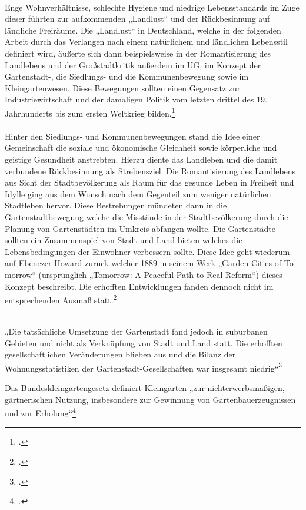 \documentclass{scrartcl}
\begin{document}
\\
Enge Wohnverhältnisse, schlechte Hygiene und niedrige Lebensstandards im Zuge dieser führten zur aufkommenden „Landlust“ und der Rückbesinnung auf ländliche Freiräume. Die „Landlust“ in Deutschland, welche in der folgenden Arbeit durch das Verlangen nach einem natürlichem und ländlichen Lebensstil definiert wird, äußerte sich dann beispielsweise in der Romantisierung des Landlebens und der Großstadtkritik außerdem im UG, im Konzept der Gartenstadt-, die Siedlungs- und die Kommunenbewegung sowie im Kleingartenwesen. Diese Bewegungen sollten einen Gegensatz zur Industriewirtschaft und der damaligen Politik vom letzten drittel des 19. Jahrhunderts bis zum ersten Weltkrieg bilden.\footcite[Vgl.][S. 35]{Egnolff2015DieIdeal}\\
\\
Hinter den Siedlungs- und Kommunenbewegungen stand die Idee einer Gemeinschaft die soziale und ökonomische Gleichheit sowie körperliche und geistige Gesundheit anstrebten. Hierzu diente das Landleben und die damit verbundene Rückbesinnung als Strebensziel. Die Romantisierung des Landlebens aus Sicht der Stadtbevölkerung als Raum für das gesunde Leben in Freiheit und Idylle ging aus dem Wunsch nach dem Gegenteil zum weniger natürlichen Stadtleben hervor. Diese Bestrebungen mündeten dann in die Gartenstadtbewegung welche die Misstände in der Stadtbevölkerung durch die Planung von Gartenstädten im Umkreis abfangen wollte. Die Gartenstädte sollten ein Zusammenspiel von Stadt und Land bieten welches die Lebensbedingungen der Einwohner verbessern sollte. Diese Idee geht wiederum auf Ebenezer Howard zurück welcher 1889 in seinem Werk „Garden Cities of To-morrow“ (ursprünglich „Tomorrow: A Peaceful Path to Real Reform“) dieses Konzept beschreibt. Die erhofften Entwicklungen fanden dennoch nicht im entsprechenden Ausmaß statt.\footcite[Vgl.][S. 36]{Egnolff2015DieIdeal}\\
\\
\begin{displayquote}
„Die tatsächliche Umsetzung der Gartenstadt fand jedoch in suburbanen Gebieten und nicht als Verknüpfung von Stadt und Land statt. Die erhofften gesellschaftlichen Veränderungen blieben aus und die Bilanz der Wohnungsstatistiken der Gartenstadt-Gesellschaften war insgesamt niedrig“\footcite[S. 36]{Egnolff2015DieIdeal} 
\end{displayquote}


Das Bundeskleingartengesetz definiert Kleingärten „zur nichterwerbsmäßigen, gärtnerischen Nutzung, insbesondere zur Gewinnung von Gartenbauerzeugnissen und zur Erholung“\footcite[§ 1]{Verbraucherschutz2006BundeskleingartengesetzBKleingG}
\end{document}

